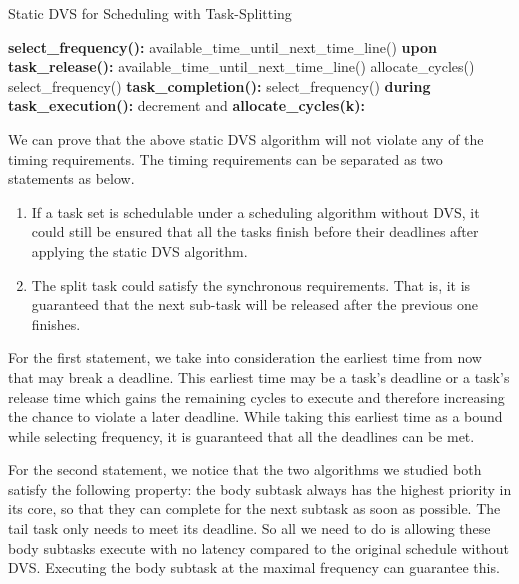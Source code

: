 \documentclass[12pt, journal,compsoc]{IEEEtran}
\begin{document}
\begin{algorithm}
\caption{Static DVS for Scheduling with Task-Splitting}
\label{ag-post}
\begin{algorithmic}[1]
\STATE \textbf{select\_frequency():}
\STATE available\_time\_until\_next\_time\_line()
\STATE 
\vspace{0.05in}
\STATE \textbf{upon task\_release():}
\STATE 
\STATE available\_time\_until\_next\_time\_line()
\STATE allocate\_cycles()
\STATE 
\ELSE
\STATE select\_frequency()
\ENDIF
\vspace{0.05in}
\STATE \textbf{task\_completion():}
\STATE 
\STATE 
\STATE select\_frequency()
\vspace{0.05in}
\STATE \textbf{during task\_execution():}
\STATE decrement  and 
\vspace{0.05in}
\STATE \textbf{allocate\_cycles(k):}
\IF {}
\STATE 
\STATE 
\ELSE
\STATE 
\STATE 
\ENDIF
\ENDFOR
\end{algorithmic}
\end{algorithm}

We can prove that the above static DVS algorithm will not violate any of the timing requirements. The timing requirements can be separated as two statements as below.

\begin{enumerate}
\item If a task set is schedulable under a scheduling algorithm without DVS, it could still be ensured that all the tasks finish before their deadlines after applying the static DVS algorithm.
\item The split task could satisfy the synchronous requirements. That is, it is guaranteed that the next sub-task will be released after the previous one finishes.
\end{enumerate}

For the first statement, we take into consideration the earliest time from now that may break a deadline. This earliest time may be a task's deadline or a task's release time which gains the remaining cycles to execute and therefore increasing the chance to violate a later deadline. While taking this earliest time as a bound while selecting frequency, it is guaranteed that all the deadlines can be met.

For the second statement, we notice that the two algorithms \cite{Guan:2010:FMS:1828428.1829220} \cite{Lakshmanan:2009:PFP:1581378.1581523} we studied both satisfy the following property: the body subtask always has the highest priority in its core, so that they can complete for the next subtask as soon as possible. The tail task only needs to meet its deadline. So all we need to do is allowing these body subtasks execute with no latency compared to the original schedule without DVS. Executing the body subtask at the maximal frequency can guarantee this.
\end{document}
